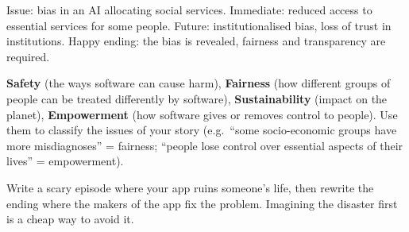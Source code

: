 \documentclass[11pt,a4paper,openany]{book}
\begin{document}
\begin{exbox}[title={``Social Services 5.0''}]
Issue: bias in an AI allocating social services. Immediate: reduced access to essential
services for some people. Future: institutionalised bias, loss of trust in institutions. Happy
ending: the bias is revealed, fairness and transparency are required.
\end{exbox}

\begin{propbox}[title={The four ethical lenses of the course}]
\textbf{Safety} (the ways software can cause harm), \textbf{Fairness} (how different groups of
people can be treated differently by software), \textbf{Sustainability} (impact on the planet),
\textbf{Empowerment} (how software gives or removes control to people). Use them to classify the
issues of your story (e.g.\ ``some socio-economic groups have more misdiagnoses'' = fairness;
``people lose control over essential aspects of their lives'' = empowerment).
\end{propbox}

\begin{goatbox}
Write a scary episode where your app ruins someone's life, then rewrite the ending where the
makers of the app fix the problem. Imagining the disaster first is a cheap way to avoid it.
\end{goatbox}
\end{document}
